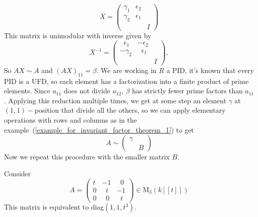 \begin{equation}
    X = \begin{pmatrix}
        \gamma_1 & \epsilon_2 & \\
        \gamma_2 & \epsilon_1 &  \\
                 &            & I
    \end{pmatrix}
\end{equation}
This matrix is unimodular with inverse given by
\begin{equation}
    X^{-1} = \begin{pmatrix}
        \;\;\epsilon_1 & -\epsilon_2 & \\
        -\gamma_2 & \;\;\epsilon_1 &  \\
                 &            & I
    \end{pmatrix},
\end{equation}
So $AX\sim A$ and $(AX)_{11}=\beta$. We are working in $R$ a PID, it's known that every PID is a UFD, so each element has a factorization into a finite product of prime elements. Since $a_{11} $ does not divide $a_{12}$, $\beta$ has strictly fewer prime factors than $a_{11}$. Applying this reduction multiple times, we get at some step an element $\gamma$ at $(1,1)-$position that divide all the others, so we can apply elementary operations with rows and columns as in the example~(\ref{example_for_invariant_factor_theorem_1}) to get
\begin{equation}
    A\sim\begin{pmatrix}
        \gamma &  \\
               & B
    \end{pmatrix}
\end{equation}
Now we repeat this procedure with the smaller matrix $B$.
\begin{dang}
    \begin{example}\label{example_for_invariant_factor_theorem_2}
        Consider 
        \begin{equation}
            A = \begin{pmatrix}
                t & -1 & \;\;0\\
                0 &\;\;t & -1\\
                0 & \;\;0 & \;\;t
            \end{pmatrix}\in \text{M}_3(k[[t]])
        \end{equation}
        This matrix is equivalent to diag$(1,1,t^3)$.
    \end{example}
\end{dang}
